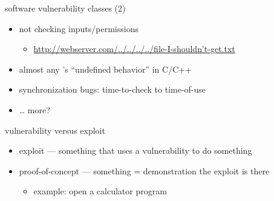 \begin{frame}{software vulnerability classes (2)}
    \begin{itemize}
    \item not checking inputs/permissions
        \begin{itemize}
        \item \url{http://webserver.com/../../../../file-I-shouldn't-get.txt}
        \end{itemize}
    \item almost any 's ``undefined behavior'' in C/C++
    \item synchronization bugs: time-to-check to time-of-use
    \item \ldots{} more?
    \end{itemize}
\end{frame}

\begin{frame}{vulnerability versus exploit}
    \begin{itemize}
    \item exploit --- something that uses a vulnerability to do something
    \item proof-of-concept --- something = demonstration the exploit is there
        \begin{itemize}
        \item example: open a calculator program
        \end{itemize}
    \end{itemize}
\end{frame}


